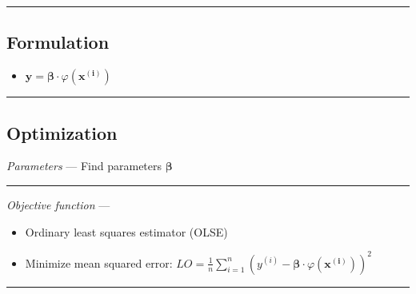 {\color{black}\hrule height 0.001mm}

\subsection*{Formulation}

\begin{itemize}
    \item $\boldsymbol{y} = \boldsymbol{\beta} \cdot \varphi(\boldsymbol{x^{(i)}})$
\end{itemize}

{\color{black}\hrule height 0.001mm}

\subsection*{Optimization}
\emph{Parameters} --- Find parameters $\boldsymbol{\beta}$

{\color{lightgray}\hrule height 0.001mm}

\emph{Objective function} --- 
\begin{itemize}
    \item Ordinary least squares estimator (OLSE)
    \item Minimize mean squared error: $LO = \frac{1}{n} \sum_{i=1}^n ( y^{(i)} - \boldsymbol{\beta} \cdot \varphi(\boldsymbol{x^{(i)}} ))^2$
\end{itemize}

{\color{lightgray}\hrule height 0.001mm}

